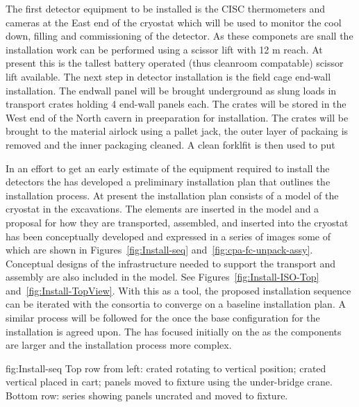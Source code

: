 The first detector equipment to be installed is the CISC thermometers and cameras at the East end of the cryostat which will be used to monitor the cool down, filling and commissioning of the detector. As these componets are snall the installation work can be performed using a scissor lift with 12 \si{m} reach. 
At present this is the tallest battery operated (thus cleanroom compatable) scissor lift available.
The next step in detector installation is the field cage end-wall installation. 
The endwall panel will be brought underground as slung loads in transport crates holding 4 end-wall panels each. The crates will be stored in the West end of the North cavern in preeparation for installation. 
The crates will be brought to the material airlock using a pallet jack,  the outer layer of packaing is removed and the inner packaging cleaned.
A clean forklfit is then used to put 



In an effort to get an early estimate of the equipment required to
install the detectors the  has developed a preliminary
installation plan that outlines the installation process. At present the installation plan consists of a \threed model of the cryostat in the excavations. The  elements are inserted in the model and a proposal for how they are transported, assembled, and inserted into the cryostat has been conceptually developed and expressed in a series of images some of which are shown in Figures~\ref{fig:Install-seq} and~\ref{fig:cpa-fc-unpack-assy}. 
%
Conceptual designs of the infrastructure needed to support
the transport and assembly are also included in the model. See Figures~\ref{fig:Install-ISO-Top} and~\ref{fig:Install-TopView}. With this
as a tool, the proposed installation sequence can be iterated with the
consortia to converge on a baseline installation plan. A similar
process will be followed for the  once the base
configuration for the  installation is agreed upon. The
 has focused initially on the  as the
 components are larger and the installation process more
complex. 

\begin{dunefigure}{fig:Install-seq}
  {Top row from left:  crated  rotating to vertical position;  crated vertical  placed in cart;  panels moved to fixture using the under-bridge crane. Bottom row: series showing  panels uncrated and moved to fixture. }
\end{dunefigure}

